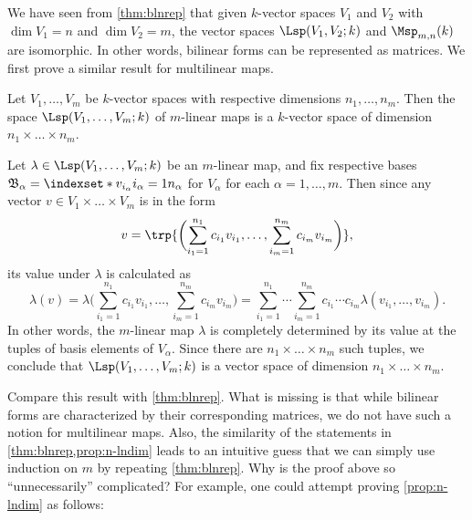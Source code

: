 \label{sec:tensornot}

We have seen from \cref{thm:blnrep} that
given \(k\)-vector spaces \(V_1\) and \(V_2\)
with \(\dim V_1=n\) and \(\dim V_2=m\),
the vector spaces \(\Lsp(V_1,V_2;k)\) and \(\Msp_{m,n}(k)\)
are isomorphic.
In other words, bilinear forms can be represented as matrices.
We first prove a similar result for multilinear maps.

\begin{proposition}
    \label{prop:n-lndim}
    Let \(V_1,\dots,V_m\) be \(k\)-vector spaces
    with respective dimensions \(n_1,\dots,n_m\).
    Then the space \(\Lsp(V_1,\dots,V_m;k)\) of \(m\)-linear maps
    is a \(k\)-vector space of dimension \(n_1\times\dots\times n_m\).
\end{proposition}
\begin{myproof}
    Let \(\lambda\in\Lsp(V_1,\dots,V_m;k)\) be an \(m\)-linear map,
    and fix respective bases \(\mathfrak B_\alpha
    =\indexset*{v_{i_\alpha}}{i_\alpha=1}{n_\alpha}\)
    for \(V_\alpha\) for each \(\alpha=1,\dots,m\).
    Then since any vector \(v\in V_1\times\dots\times V_m\)
    is in the form
    \[
        v
        =\trp{\biggl(\sum_{i_1=1}^{n_1}c_{i_1}v_{i_1},
            \dots,
            \sum_{i_m=1}^{n_m}c_{i_m}v_{i_m}\biggr)},
    \]
    its value under \(\lambda\) is calculated as
    \[
        \lambda(v)
        =\lambda\biggl(\sum_{i_1=1}^{n_1}c_{i_1}v_{i_1},
            \dots,
            \sum_{i_m=1}^{n_m}c_{i_m}v_{i_m}\biggr)
        =\sum_{i_1=1}^{n_1}\cdots\sum_{i_m=1}^{n_m}
            c_{i_1}\cdots c_{i_m}\lambda(v_{i_1},\dots,v_{i_m}).
    \]
    In other words,
    the \(m\)-linear map \(\lambda\) is completely determined by
    its value at the tuples of basis elements of \(V_\alpha\).
    Since there are \(n_1\times\dots\times n_m\) such tuples,
    we conclude that \(\Lsp(V_1,\dots,V_m;k)\) is a vector space
    of dimension \(n_1\times\dots\times n_m\).
\end{myproof}

Compare this result with \cref{thm:blnrep}.
What is missing is that
while bilinear forms are characterized by their corresponding matrices,
we do not have such a notion for multilinear maps.
Also, the similarity of the statements in \cref{thm:blnrep,prop:n-lndim}
leads to an intuitive guess that
we can simply use induction on \(m\) by repeating \cref{thm:blnrep}.
Why is the proof above so ``unnecessarily'' complicated?
For example, one could attempt proving \cref{prop:n-lndim} as follows:

